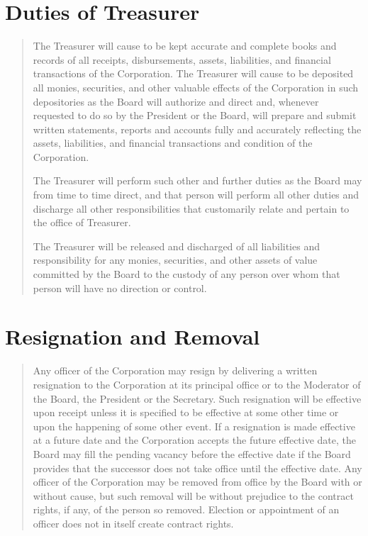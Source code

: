 \documentclass[
]{book}
\begin{document}
\section{Duties of Treasurer}\label{duties-of-treasurer}

\begin{quote}
The Treasurer will cause to be kept accurate and complete books and
records of all receipts, disbursements, assets, liabilities, and
financial transactions of the Corporation. The Treasurer will cause to
be deposited all monies, securities, and other valuable effects of the
Corporation in such depositories as the Board will authorize and
direct and, whenever requested to do so by the President or the Board,
will prepare and submit written statements, reports and accounts fully
and accurately reflecting the assets, liabilities, and financial
transactions and condition of the Corporation.

The Treasurer will perform such other and further duties as the Board
may from time to time direct, and that person will perform all other
duties and discharge all other responsibilities that customarily
relate and pertain to the office of Treasurer.

The Treasurer will be released and discharged of all liabilities and
responsibility for any monies, securities, and other assets of value
committed by the Board to the custody of any person over whom that
person will have no direction or control.
\end{quote}

\section{Resignation and Removal}\label{resignation-and-removal}

\begin{quote}
Any officer of the Corporation may resign by delivering a written
resignation to the Corporation at its principal office or to the
Moderator of the Board, the President or the Secretary. Such
resignation will be effective upon receipt unless it is specified to
be effective at some other time or upon the happening of some other
event. If a resignation is made effective at a future date and the
Corporation accepts the future effective date, the Board may fill the
pending vacancy before the effective date if the Board provides that
the successor does not take office until the effective date. Any
officer of the Corporation may be removed from office by the Board
with or without cause, but such removal will be without prejudice to
the contract rights, if any, of the person so removed. Election or
appointment of an officer does not in itself create contract rights.
\end{quote}
\end{document}
